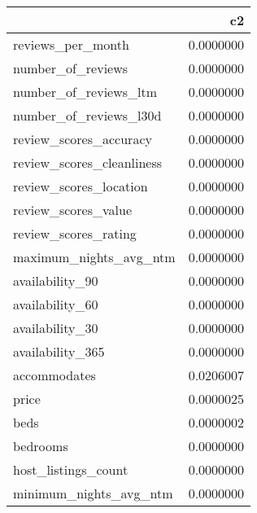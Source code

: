 
\begin{tabular}[t]{lr}
\toprule
  & c2\\
\midrule
reviews\_per\_month & 0.0000000\\
number\_of\_reviews & 0.0000000\\
number\_of\_reviews\_ltm & 0.0000000\\
number\_of\_reviews\_l30d & 0.0000000\\
review\_scores\_accuracy & 0.0000000\\
\addlinespace
review\_scores\_cleanliness & 0.0000000\\
review\_scores\_location & 0.0000000\\
review\_scores\_value & 0.0000000\\
review\_scores\_rating & 0.0000000\\
maximum\_nights\_avg\_ntm & 0.0000000\\
\addlinespace
availability\_90 & 0.0000000\\
availability\_60 & 0.0000000\\
availability\_30 & 0.0000000\\
availability\_365 & 0.0000000\\
accommodates & 0.0206007\\
\addlinespace
price & 0.0000025\\
beds & 0.0000002\\
bedrooms & 0.0000000\\
host\_listings\_count & 0.0000000\\
minimum\_nights\_avg\_ntm & 0.0000000\\
\bottomrule
\end{tabular}